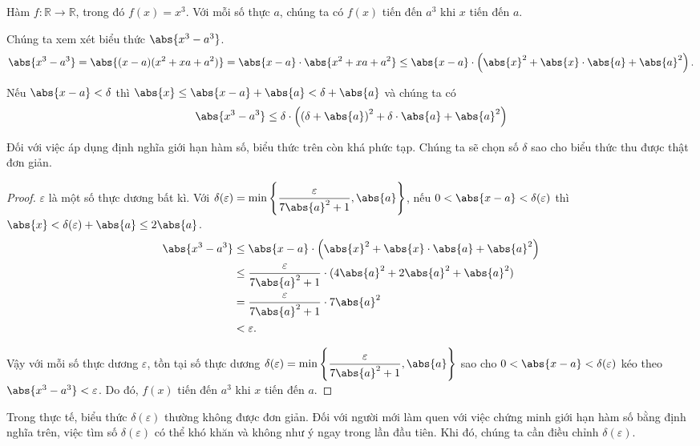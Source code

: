 \begin{example}\label{example:limits-of-cubic-function}
    Hàm $f: \mathbb{R}\to \mathbb{R}$, trong đó $f(x) = x^{3}$. Với mỗi số thực $a$, chúng ta có $f(x)$ tiến đến $a^{3}$ khi $x$ tiến đến $a$.

    Chúng ta xem xét biểu thức $\abs{x^{3} - a^{3}}$.
    \[
        \abs{x^{3} - a^{3}} = \abs{(x - a)(x^{2} + xa + a^{2})} = \abs{x-a}\cdot\abs{x^{2} + xa + a^{2}}\leq \abs{x-a}\cdot \left(\abs{x}^{2} + \abs{x}\cdot\abs{a} + \abs{a}^{2}\right).
    \]

    Nếu $\abs{x - a} < \delta$ thì $\abs{x}\leq \abs{x - a} + \abs{a} < \delta + \abs{a}$ và chúng ta có
    \[
        \abs{x^{3} - a^{3}}\leq \delta\cdot \left( {(\delta + \abs{a})}^{2} + \delta\cdot\abs{a} + \abs{a}^{2} \right)
    \]

    Đối với việc áp dụng định nghĩa giới hạn hàm số, biểu thức trên còn khá phức tạp. Chúng ta sẽ chọn số $\delta$ sao cho biểu thức thu được thật đơn giản.
    \begin{proof}
        $\varepsilon$ là một số thực dương bất kì. Với $\delta(\varepsilon) = \min\left\{ \dfrac{\varepsilon}{7\abs{a}^{2} + 1}, \abs{a} \right\}$, nếu $0 < \abs{x - a} < \delta(\varepsilon)$ thì $\abs{x} < \delta(\varepsilon) + \abs{a}\leq 2\abs{a}$.
        \begin{align*}
            \abs{x^{3} - a^{3}} & \leq \abs{x-a}\cdot\left(\abs{x}^{2} + \abs{x}\cdot\abs{a} + \abs{a}^{2}\right)            \\
                                & \leq \frac{\varepsilon}{7\abs{a}^{2} + 1}\cdot (4\abs{a}^{2} + 2\abs{a}^{2} + \abs{a}^{2}) \\
                                & = \frac{\varepsilon}{7\abs{a}^{2} + 1}\cdot 7\abs{a}^{2}                                   \\
                                & < \varepsilon.
        \end{align*}

        Vậy với mỗi số thực dương $\varepsilon$, tồn tại số thực dương  $\delta(\varepsilon) = \min\left\{ \dfrac{\varepsilon}{7\abs{a}^{2} + 1}, \abs{a} \right\}$ sao cho $0 < \abs{x - a} < \delta(\varepsilon)$ kéo theo $\abs{x^{3} - a^{3}} < \varepsilon$. Do đó, $f(x)$ tiến đến $a^{3}$ khi $x$ tiến đến $a$.
    \end{proof}
\end{example}

Trong thực tế, biểu thức $\delta(\varepsilon)$ thường không được đơn giản. Đối với người mới làm quen với việc chứng minh giới hạn hàm số bằng định nghĩa trên, việc tìm số $\delta(\varepsilon)$ có thể khó khăn và không như ý ngay trong lần đầu tiên. Khi đó, chúng ta cần điều chỉnh $\delta(\varepsilon)$.

